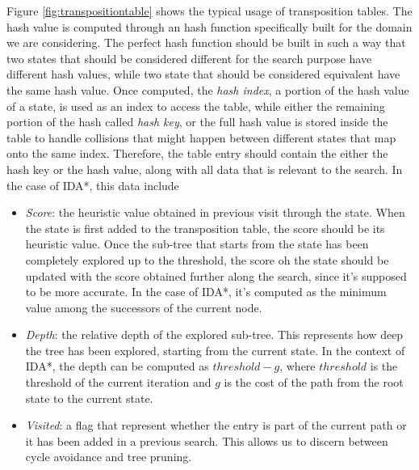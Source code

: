 \medskip\noindent
Figure \ref{fig:transpositiontable} shows the typical usage of transposition tables. The hash value is computed through an hash function specifically built for the domain we are considering. The perfect hash function should be built in such a way that two states that should be considered different for the search purpose have different hash values, while two state that should be considered equivalent have the same hash value. Once computed, the \textit{hash index}, a portion of the hash value of a state, is used as an index to access the table, while either the remaining portion of the hash called \textit{hash key}, or the full hash value is stored inside the table to handle collisions that might happen between different states that map onto the same index.
Therefore, the table entry should contain the either the hash key or the hash value, along with all data that is relevant to the search. In the case of IDA*, this data include
\begin{itemize}
    \item \textit{Score}: the heuristic value obtained in previous visit through the state. When the state is first added to the transposition table, the score should be its heuristic value. Once the sub-tree that starts from the state has been completely explored up to the threshold, the score oh the state should be updated with the score obtained further along the search, since it's supposed to be more accurate. In the case of IDA*, it's computed as the minimum value among the successors of the current node.
    \item \textit{Depth}: the relative depth of the explored sub-tree. This represents how deep the tree has been explored, starting from the current state. In the context of IDA*, the depth can be computed as $threshold-g$, where $threshold$ is the threshold of the current iteration and $g$ is the cost of the path from the root state to the current state.
    \item \textit{Visited}: a flag that represent whether the entry is part of the current path or it has been added in a previous search. This allows us to discern between cycle avoidance and tree pruning.
\end{itemize}

